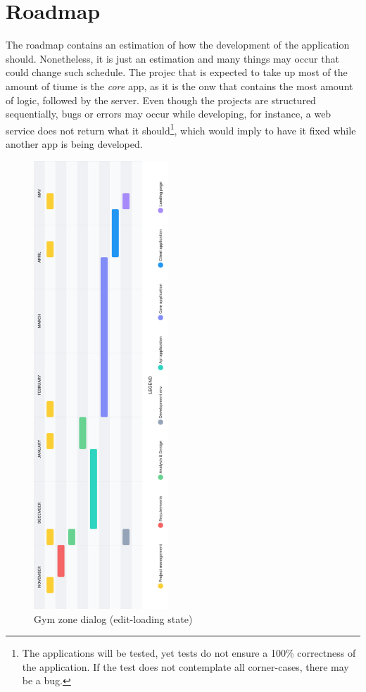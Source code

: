 \documentclass[a4paper, 12pt, oneside]{book}
\begin{document}
\section{Roadmap}
The roadmap contains an estimation of how the development of the application should. Nonetheless, it is just an estimation and many things may occur that could change such schedule. The projec that is expected to take up most of the amount of tiume is the \emph{core} app, as it is the onw that contains the most amount of logic, followed by the server. Even though the projects are structured sequentially, bugs or errors may occur while developing, for instance, a web service does not return what it should\footnote{The applications will be tested, yet tests do not ensure a 100\% correctness of the application. If the test does not contemplate all corner-cases, there may be a bug.}, which would imply to have it fixed while another app is being developed.
\newpage
\begin{figure}[H]
	\centering
	\includegraphics[width=0.45\textwidth]{assets/roadmap.png}
	\caption{Gym zone dialog (edit-loading state)}
\end{figure}
\end{document}
